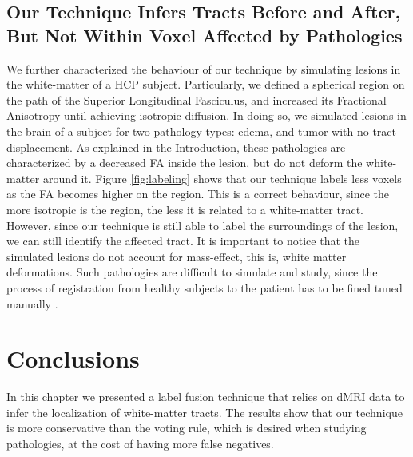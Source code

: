 \subsection{Our Technique Infers Tracts Before and After, But Not Within 
            Voxel Affected by Pathologies}
We further characterized the behaviour of our technique by simulating lesions
in the white-matter of a HCP subject. Particularly, we defined a spherical region
on the path of the Superior Longitudinal Fasciculus, and increased its
Fractional Anisotropy until achieving isotropic diffusion. In doing so, we
simulated lesions in the brain of a subject for two pathology types:
edema, and tumor with no tract displacement. As explained in the Introduction,
these pathologies are characterized by a decreased FA inside
the lesion, but do not deform the white-matter around it. Figure \ref{fig:labeling}
shows that our technique labels less voxels as the FA becomes higher on the
region. This is a correct behaviour, since the more isotropic is the region,
the less it is related to a white-matter tract. However, since our technique
is still able to label the surroundings of the lesion, we can still identify
the affected tract. It is important to notice that the simulated lesions do not
account for mass-effect, this is, white matter deformations. Such pathologies
are difficult to simulate and study, since the process of registration from
healthy subjects to the patient has to be fined tuned manually . 

\section{Conclusions}
In this chapter we presented a label fusion technique that relies on dMRI
data to infer the localization of white-matter tracts. The results show that
our technique is more conservative than the voting rule, which is desired when
studying pathologies, at the cost of having more false negatives.

\chapterbib

